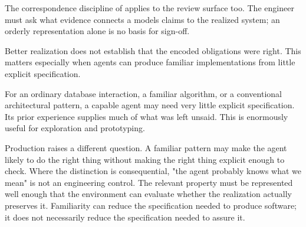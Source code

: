 
The correspondence discipline of  applies to the review surface too. The engineer must ask what evidence connects a model\textquotesingle s claims to the realized system; an orderly representation alone is no basis for sign-off.


Better realization does not establish that the encoded obligations were right. This matters especially when agents can produce familiar implementations from little explicit specification.


For an ordinary database interaction, a familiar algorithm, or a conventional architectural pattern, a capable agent may need very little explicit specification. Its prior experience supplies much of what was left unsaid. This is enormously useful for exploration and prototyping.


Production raises a different question. A familiar pattern may make the agent likely to do the right thing without making the right thing explicit enough to check. Where the distinction is consequential, "the agent probably knows what we mean" is not an engineering control. The relevant property must be represented well enough that the environment can evaluate whether the realization actually preserves it. Familiarity can reduce the specification needed to produce software; it does not necessarily reduce the specification needed to assure it.

